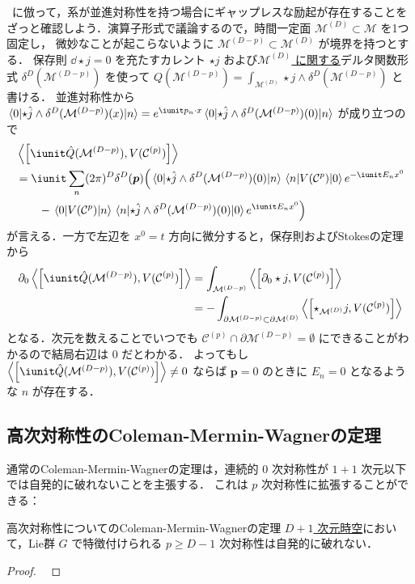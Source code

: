 \documentclass[TQFT_main]{subfiles}
\begin{document}
~\cite[p.5-6]{Lake2018SSB}に倣って，系が並進対称性を持つ場合にギャップレスな励起が存在することをざっと確認しよう．演算子形式で議論するので，時間一定面 $\mathcal{M}^(D) \subset \mathcal{M}$ を1つ固定し，
微妙なことが起こらないように $\mathcal{M}^{(D-p)} \subset \mathcal{M}^{(D)}$ が境界を持つとする．
保存則 $\dd \star j = 0$ を充たすカレント $\star j$ および\underline{$\mathcal{M}^{(D)}$ に関する}デルタ関数形式 $\delta^D(\mathcal{M}^{(D-p)})$ を使って $Q(\mathcal{M}^{(D-p)}) = \int_{\mathcal{M}^{(D)}} \star j \wedge \delta^D(\mathcal{M}^{(D-p)})$ と書ける．
並進対称性から $\mel{0}{\star \hat{j} \wedge \delta^D(\mathcal{M}^{(D-p)})(x)}{n} = e^{\iunit p_n \cdot x} \mel{0}{\star \hat{j} \wedge \delta^D(\mathcal{M}^{(D-p)})(0)}{n}$ が成り立つので
\begin{align}
    &\expval{\comm{\iunit \hat{Q}(\mathcal{M}^{(D-p)})}{V(\mathcal{C}^{(p)})}} \\
    &= \iunit \sum_n (2\pi)^{D} \delta^D(\bm{p}) \Bigl( \mel{0}{\star \hat{j} \wedge \delta^D(\mathcal{M}^{(D-p)}) (0)}{n} \mel{n}{V(\mathcal{C}^{p})}{0} e^{-\iunit E_n x^0} \\
    &\qquad -  \mel{0}{V(\mathcal{C}^{p})}{n} \mel{n}{\star \hat{j} \wedge \delta^D(\mathcal{M}^{(D-p)}) (0)}{0} e^{\iunit E_n x^0}\Bigr) 
\end{align}
が言える．一方で左辺を $x^0 = t$ 方向に微分すると，保存則およびStokesの定理から
\begin{align}
    \partial_0\expval{\comm{\iunit \hat{Q}(\mathcal{M}^{(D-p)})}{V(\mathcal{C}^{(p)})}}
    &= \int_{\mathcal{M}^{(D-p)}} \expval{\comm{\partial_0 \star j}{V(\mathcal{C}^{(p)})}} \\
    &= -\int_{\partial\mathcal{M}^{(D-p)} \subset \partial \mathcal{M}^{(D)}} \expval{\comm{\star_{\mathcal{M}^{(D)}} j}{V(\mathcal{C}^{(p)})}}
\end{align}
となる．次元を数えることでいつでも $\mathcal{C}^{(p)} \cap \partial\mathcal{M}^{(D-p)} = \emptyset$ にできることがわかるので結局右辺は $0$ だとわかる．
よってもし $\expval{\comm{\iunit \hat{Q}(\mathcal{M}^{(D-p)})}{V(\mathcal{C}^{(p)})}} \neq 0$ ならば $\bm{p} = 0$ のときに $E_n = 0$ となるような $n$ が存在する．

\subsection{高次対称性のColeman-Mermin-Wagnerの定理}

通常のColeman-Mermin-Wagnerの定理は，連続的 $0$ 次対称性が $1+1$ 次元以下では自発的に破れないことを主張する．
これは $p$ 次対称性に拡張することができる：

\begin{mytheo}[label=thm:pform-CMW]{高次対称性についてのColeman-Mermin-Wagnerの定理}
    \underline{$D+1$ 次元時空}において，Lie群 $G$ で特徴付けられる $p \ge D - 1$ 次対称性は自発的に破れない．
\end{mytheo}

\begin{proof}
    ~\cite[text]{Lake2018SSB}
\end{proof}
\end{document}
